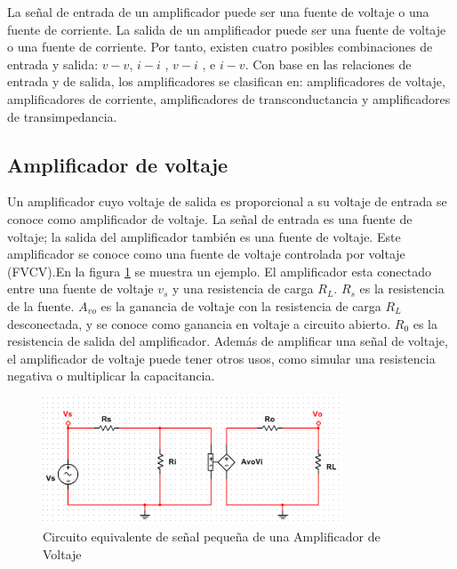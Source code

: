 \documentclass[12pt]{book}
\theoremstyle{definition}
\theoremstyle{remark}
\theoremstyle{plain}
\begin{document}
La señal de entrada de un amplificador puede ser una fuente de voltaje o una fuente de corriente. La salida de un amplificador puede ser una fuente de voltaje o una fuente de corriente. Por tanto, existen cuatro posibles combinaciones de entrada y salida: $v-v$, $i-i$ , $v-i$ , e  $i-v$. Con base en las relaciones de entrada y de salida, los amplificadores se clasifican en: amplificadores de voltaje, amplificadores de corriente, amplificadores de transconductancia y amplificadores de transimpedancia.

\subsection{Amplificador de voltaje}

Un amplificador cuyo voltaje de salida es proporcional a su voltaje de entrada se conoce como amplificador de voltaje. La señal de entrada es una fuente de voltaje; la salida del amplificador también es una fuente de voltaje. Este amplificador se conoce como una fuente de voltaje controlada por voltaje (FVCV).En la figura \ref{fig4} se muestra un ejemplo. El amplificador esta conectado entre una fuente de voltaje $v_s$ y una resistencia de carga $R_L$. $R_s$ es la resistencia de la fuente.  $A_{vo}$  es la ganancia de voltaje con la resistencia de carga $R_L$ desconectada, y se conoce como ganancia en voltaje a circuito abierto. $R_0$ es la resistencia de salida del amplificador. Además de amplificar una señal de voltaje, el amplificador de voltaje puede tener otros usos, como simular una resistencia negativa o multiplicar la capacitancia.


\begin{figure}
\centering
\includegraphics[width=3.5in]{AmplificadorVoltaje.png}
\caption{Circuito equivalente de señal pequeña de una Amplificador de Voltaje}
\label{fig4}
\end{figure}
\end{document}

